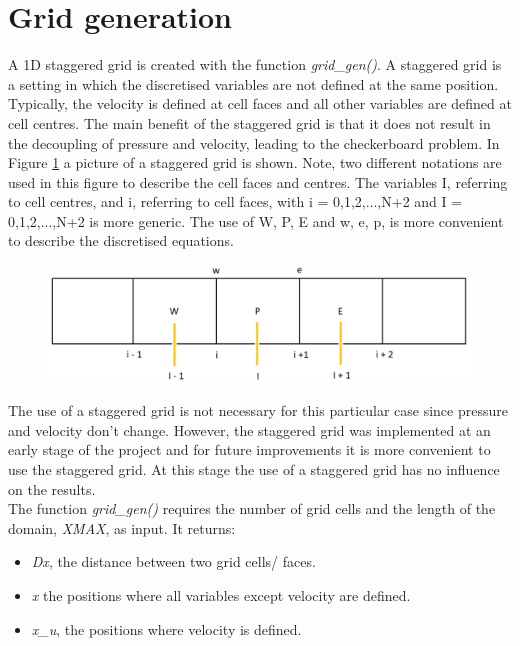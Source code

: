 \section{Grid generation}
A 1D staggered grid is created with the function \textit{grid\_gen()}. A staggered grid is a setting in which the discretised variables are not defined at the same position. Typically, the velocity is defined at cell faces and all other variables are defined at cell centres. The main benefit of the staggered grid is that it does not result in the decoupling of pressure and velocity, leading to the checkerboard problem. In Figure \ref{fig:fig9} a picture of a staggered grid is shown. Note, two different notations are used in this figure to describe the cell faces and centres. The variables I, referring to cell centres, and i, referring to cell faces, with i = 0,1,2,...,N+2 and I = 0,1,2,...,N+2 is more generic. The use of W, P, E and w, e, p, is more convenient to describe the discretised equations.  

\begin{figure}[H]
	\centering
	\includegraphics[width= 1\textwidth]{Images/fig1.png}
	\label{fig:fig9}
\end{figure}
The use of a staggered grid is not necessary for this particular case since pressure and velocity don't change. However, the staggered grid was implemented at an early stage of the project and for future improvements it is more convenient to use the staggered grid. At this stage the use of a staggered grid has no influence on the results.  \\

The function \textit{grid\_gen()} requires the number of grid cells and the length of the domain, \textit{XMAX}, as input. It returns:
\begin{itemize}
	\item \textit{Dx}, the distance between two grid cells/ faces.
	\item \textit{x} the positions where all variables except velocity are defined.  
	\item \textit{x\_u}, the positions where velocity is defined. 
\end{itemize}


